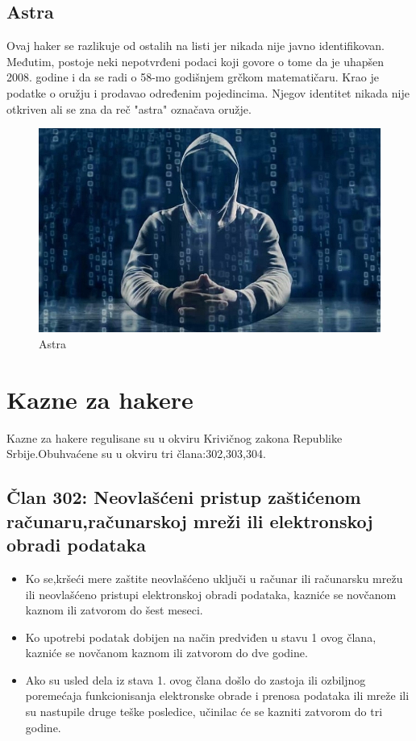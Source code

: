 \documentclass[a4paper]{article}
\begin{document}
\subsection{Astra}
Ovaj haker se razlikuje od ostalih na listi jer nikada nije javno identifikovan. Međutim, postoje neki nepotvrđeni podaci koji govore o tome da je uhapšen 2008. godine i da se radi o 58-mo godišnjem grčkom matematičaru. Krao je podatke o oružju i prodavao određenim pojedincima. Njegov identitet nikada nije otkriven ali se zna da reč "astra" označava oružje.
\begin{figure}[h!]
	\begin{center}
		\includegraphics[scale=0.20]{astra.jpg}
	\end{center}
	\caption{Astra}
	\label{fig:astra}
\end{figure}
\newpage
\section{Kazne za hakere}
\label{kazne}
Kazne za hakere regulisane su u okviru Krivičnog zakona Republike Srbije.Obuhvaćene su u okviru tri člana:302,303,304.
\subsection{Član 302: Neovlašćeni pristup zaštićenom računaru,računarskoj mreži ili elektronskoj obradi podataka}
\begin{itemize}
	\item Ko se,kršeći mere zaštite neovlašćeno uključi u računar ili računarsku mrežu ili neovlašćeno pristupi elektronskoj obradi podataka, kazniće se novčanom kaznom ili zatvorom do šest meseci.
	\item Ko upotrebi podatak dobijen na način predviđen u stavu 1 ovog člana, kazniće se novčanom kaznom ili zatvorom do dve godine.
	\item Ako su usled dela iz stava 1. ovog člana došlo do zastoja ili ozbiljnog poremećaja funkcionisanja elektronske obrade i prenosa podataka ili mreže ili su nastupile druge teške posledice, učinilac će se kazniti zatvorom do tri godine.
\end{itemize}
\end{document}
